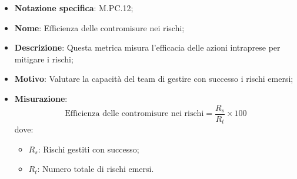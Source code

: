 \begin{itemize}
    \item \textbf{Notazione specifica}: M.PC.12;
    \item \textbf{Nome}: Efficienza delle contromisure nei rischi;
    \item \textbf{Descrizione}: Questa metrica misura l'efficacia delle azioni intraprese per mitigare i rischi;
    \item \textbf{Motivo}: Valutare la capacità del team di gestire con successo i rischi emersi;
    \item \textbf{Misurazione}:
    \[
        \text{Efficienza delle contromisure nei rischi} = \frac{R_s}{R_t} \times 100
    \]
    dove:
    \begin{itemize}
        \item $R_{s}$: Rischi gestiti con successo;
        \item $R_{t}$: Numero totale di rischi emersi.
    \end{itemize}
\end{itemize}